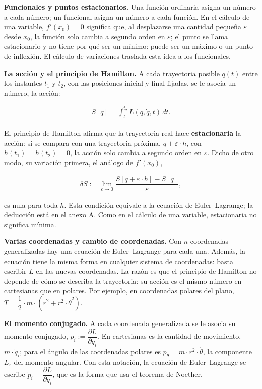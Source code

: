 \documentclass[11pt,a4paper,spanish]{book}
\begin{document}
\textbf{Funcionales y puntos estacionarios.} Una función ordinaria
asigna un número a cada número; un funcional asigna un número a cada
función. En el cálculo de una variable, \(f'(x_0) = 0\) significa que,
al desplazarse una cantidad pequeña \(\varepsilon\) desde \(x_0\), la
función solo cambia a segundo orden en \(\varepsilon\); el punto se
llama estacionario y no tiene por qué ser un mínimo: puede ser un máximo
o un punto de inflexión. El cálculo de variaciones traslada esta idea a
los funcionales.

\textbf{La acción y el principio de Hamilton.} A cada trayectoria
posible \(q(t)\) entre los instantes \(t_1\) y \(t_2\), con las
posiciones inicial y final fijadas, se le asocia un número, la acción:

\[
\begin{aligned}
S[q] = \int_{t_1}^{t_2} L(q, \dot{q}, t) \,dt.
\end{aligned}
\]

El principio de Hamilton afirma que la trayectoria real hace
\textbf{estacionaria} la acción: si se compara con una trayectoria
próxima, \(q + \varepsilon \cdot h\), con \(h(t_1) = h(t_2) = 0\), la
acción solo cambia a segundo orden en \(\varepsilon\). Dicho de otro
modo, su variación primera, el análogo de \(f'(x_0)\),

\[
\begin{aligned}
\delta S := \lim_{\varepsilon \to 0} \dfrac{S[q + \varepsilon \cdot h] - S[q]}{\varepsilon},
\end{aligned}
\]

es nula para toda \(h\). Esta condición equivale a la ecuación de
Euler--Lagrange; la deducción está en el anexo A. Como en el cálculo de
una variable, estacionaria no significa mínima.

\textbf{Varias coordenadas y cambio de coordenadas.} Con \(n\)
coordenadas generalizadas hay una ecuación de Euler--Lagrange para cada
una. Además, la ecuación tiene la misma forma en cualquier sistema de
coordenadas: basta escribir \(L\) en las nuevas coordenadas. La razón es
que el principio de Hamilton no depende de cómo se describa la
trayectoria: su acción es el mismo número en cartesianas que en polares.
Por ejemplo, en coordenadas polares del plano,
\(T = \dfrac{1}{2} \cdot m \cdot (\dot{r}^2 + r^2 \cdot \dot{\theta}^2)\).

\textbf{El momento conjugado.} A cada coordenada generalizada se le
asocia su momento conjugado,
\(p_i := \dfrac{\partial L}{\partial \dot{q}_i}\). En cartesianas es la
cantidad de movimiento, \(m \cdot \dot{q}_i\); para el ángulo de las
coordenadas polares es \(p_\theta = m \cdot r^2 \cdot \dot{\theta}\), la
componente \(L_z\) del momento angular. Con esta notación, la ecuación
de Euler--Lagrange se escribe
\(\dot{p}_i = \dfrac{\partial L}{\partial q_i}\), que es la forma que
usa el teorema de Noether.
\end{document}

